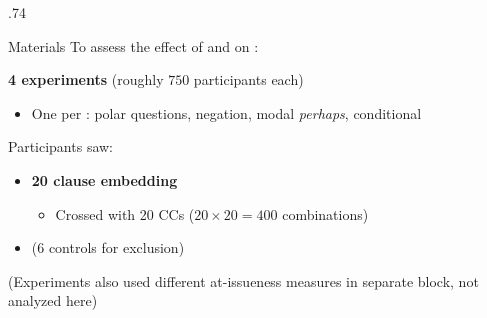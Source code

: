 \documentclass[final]{beamer}
\newlength{\sepwidth}
\newlength{\colwidth}
\newlength{\vboxsep}
\newcommand{\separatorcolumn}{\begin{column}{\sepwidth}\end{column}}
\begin{document}
\begin{frame}[t]
\begin{columns}[t]
\begin{column}{.74\colwidth}
			\vspace{\vboxsep}
			\begin{normalbox}{Materials}
				To assess the effect of  and  on :
				\vspace{.2\baselineskip}

					\textbf{4 experiments} (roughly $750$ participants each)
					\vspace{-.3\baselineskip}
					\begin{itemize}
						\item One per : polar questions, negation, modal \textit{perhaps}, conditional
					\end{itemize}

					\vspace{-.2\baselineskip}
					Participants saw:
					\vspace{-.3\baselineskip}
					\begin{itemize}
						\item \textbf{20 clause embedding }

						\begin{itemize}
							\item  Crossed with 20 CCs ($20 \times 20 = 400$ combinations)
						\end{itemize}

						\item (6 controls for exclusion)

					\end{itemize}
				\vspace{-.2\baselineskip}
				{\small (Experiments also used different at-issueness measures in separate block, not analyzed here)}

			\end{normalbox}
			
		\end{column}

		\separatorcolumn
		

\end{columns}
\end{frame}
\end{document}

